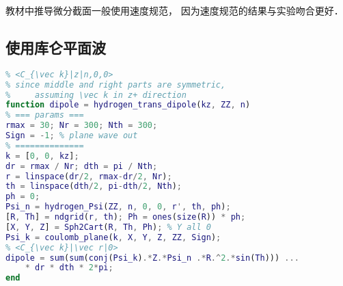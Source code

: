 教材中推导微分截面一般使用速度规范， 因为速度规范的结果与实验吻合更好．

\subsection{使用库仑平面波}

\begin{lstlisting}[language=matlab]
% exact hydrogen transition dipole with Coulomb plane wave
% <C_{\vec k}|z|n,0,0>
% since middle and right parts are symmetric,
%     assuming \vec k in z+ direction
function dipole = hydrogen_trans_dipole(kz, ZZ, n)
% === params ===
rmax = 30; Nr = 300; Nth = 300;
Sign = -1; % plane wave out
% ==============
k = [0, 0, kz];
dr = rmax / Nr; dth = pi / Nth;
r = linspace(dr/2, rmax-dr/2, Nr);
th = linspace(dth/2, pi-dth/2, Nth); 
ph = 0;
Psi_n = hydrogen_Psi(ZZ, n, 0, 0, r', th, ph);
[R, Th] = ndgrid(r, th); Ph = ones(size(R)) * ph;
[X, Y, Z] = Sph2Cart(R, Th, Ph); % Y all 0
Psi_k = coulomb_plane(k, X, Y, Z, ZZ, Sign);
% <C_{\vec k}|\vec r|0>
dipole = sum(sum(conj(Psi_k).*Z.*Psi_n .*R.^2.*sin(Th))) ...
    * dr * dth * 2*pi;
end
\end{lstlisting}
